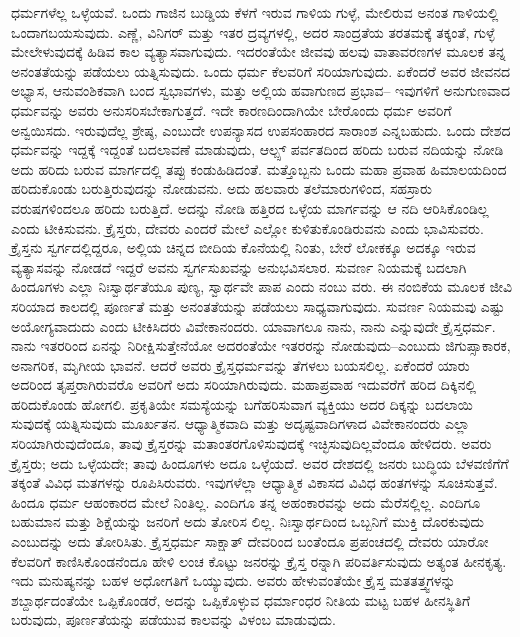 ಧರ್ಮಗಳೆಲ್ಲ ಒಳ್ಳೆಯವೆ. ಒಂದು ಗಾಜಿನ ಬುಡ್ಡಿಯ ಕೆಳಗೆ ಇರುವ ಗಾಳಿಯ ಗುಳ್ಳೆ, ಮೇಲಿರುವ ಅನಂತ ಗಾಳಿಯಲ್ಲಿ ಒಂದಾಗಬಯಸುವುದು. ಎಣ್ಣೆ, ವಿನಿಗರ್​ ಮತ್ತು ಇತರ ದ್ರವ್ಯಗಳಲ್ಲಿ, ಅದರ ಸಾಂದ್ರತೆಯ ತರತಮಕ್ಕೆ ತಕ್ಕಂತೆ, ಗುಳ್ಳೆ ಮೇಲೇಳುವುದಕ್ಕೆ ಹಿಡಿವ ಕಾಲ ವ್ಯತ್ಯಾಸವಾಗುವುದು. ಇದರಂತೆಯೇ ಜೀವವು ಹಲವು ವಾತಾವರಣಗಳ ಮೂಲಕ ತನ್ನ ಅನಂತತೆಯನ್ನು ಪಡೆಯಲು ಯತ್ನಿಸುವುದು. ಒಂದು ಧರ್ಮ ಕೆಲವರಿಗೆ ಸರಿಯಾಗುವುದು. ಏಕೆಂದರೆ ಅವರ ಜೀವನದ ಅಭ್ಯಾಸ, ಆನುವಂಶಿಕವಾಗಿ ಬಂದ ಸ್ವಭಾವಗಳು, ಮತ್ತು ಅಲ್ಲಿಯ ಹವಾಗುಣದ ಪ್ರಭಾವ– ಇವುಗಳಿಗೆ ಅನುಗುಣವಾದ ಧರ್ಮವನ್ನು ಅವರು ಅನುಸರಿಸಬೇಕಾಗುತ್ತದೆ. ಇದೇ ಕಾರಣದಿಂದಾಗಿಯೇ ಬೇರೊಂದು ಧರ್ಮ ಅವರಿಗೆ ಅನ್ವಯಿಸದು. ಇರುವುದೆಲ್ಲ ಶ್ರೇಷ್ಠ, ಎಂಬುದೇ ಉಪನ್ಯಾಸದ ಉಪಸಂಹಾರದ ಸಾರಾಂಶ ಎನ್ನಬಹುದು. ಒಂದು ದೇಶದ ಧರ್ಮವನ್ನು ಇದ್ದಕ್ಕೆ ಇದ್ದಂತೆ ಬದಲಾವಣೆ ಮಾಡುವುದು, ಆಲ್ಪ್ಸ್ ಪರ್ವತದಿಂದ ಹರಿದು ಬರುವ ನದಿಯನ್ನು ನೋಡಿ ಅದು ಹರಿದು ಬರುವ ಮಾರ್ಗದಲ್ಲಿ ತಪ್ಪು ಕಂಡುಹಿಡಿದಂತೆ. ಮತ್ತೊಬ್ಬನು ಒಂದು ಮಹಾ ಪ್ರವಾಹ ಹಿಮಾಲಯದಿಂದ ಹರಿದುಕೊಂಡು ಬರುತ್ತಿರುವುದನ್ನು ನೋಡುವನು. ಅದು ಹಲವಾರು ತಲೆಮಾರುಗಳಿಂದ, ಸಹಸ್ರಾರು ವರುಷಗಳಿಂದಲೂ ಹರಿದು ಬರುತ್ತಿದೆ. ಅದನ್ನು ನೋಡಿ ಹತ್ತಿರದ ಒಳ್ಳೆಯ ಮಾರ್ಗವನ್ನು ಆ ನದಿ ಆರಿಸಿಕೊಂಡಿಲ್ಲ ಎಂದು ಟೀಕಿಸುವನು. ಕ್ರೈಸ್ತರು, ದೇವರು ಎಂದರೆ ಮೇಲೆ ಎಲ್ಲೋ ಕುಳಿತುಕೊಂಡಿರುವನು ಎಂದು ಭಾವಿಸುವರು. ಕ್ರೈಸ್ತನು ಸ್ವರ್ಗದಲ್ಲಿದ್ದರೂ, ಅಲ್ಲಿಯ ಚಿನ್ನದ ಬೀದಿಯ ಕೊನೆಯಲ್ಲಿ ನಿಂತು, ಬೇರೆ ಲೋಕಕ್ಕೂ ಅದಕ್ಕೂ ಇರುವ ವ್ಯತ್ಯಾಸವನ್ನು ನೋಡದೆ ಇದ್ದರೆ ಅವನು ಸ್ವರ್ಗಸುಖವನ್ನು ಅನುಭವಿಸಲಾರ. ಸುವರ್ಣ ನಿಯಮಕ್ಕೆ ಬದಲಾಗಿ ಹಿಂದೂಗಳು ಎಲ್ಲಾ ನಿಃಸ್ವಾರ್ಥತೆಯೂ ಪುಣ್ಯ, ಸ್ವಾರ್ಥವೇ ಪಾಪ ಎಂದು ನಂಬು ವರು. ಈ ನಂಬಿಕೆಯ ಮೂಲಕ ಜೀವಿ ಸರಿಯಾದ ಕಾಲದಲ್ಲಿ ಪೂರ್ಣತೆ ಮತ್ತು ಅನಂತತೆಯನ್ನು ಪಡೆಯಲು ಸಾಧ್ಯವಾಗುವುದು. ಸುವರ್ಣ ನಿಯಮವು ಎಷ್ಟು ಅಯೋಗ್ಯವಾದುದು ಎಂದು ಟೀಕಿಸಿದರು ವಿವೇಕಾನಂದರು. ಯಾವಾಗಲೂ ನಾನು, ನಾನು ಎನ್ನುವುದೇ ಕ್ರೈಸ್ತಧರ್ಮ. ನಾನು ಇತರರಿಂದ ಏನನ್ನು ನಿರೀಕ್ಷಿಸುತ್ತೇನೆಯೋ ಅದರಂತೆಯೇ ಇತರರನ್ನು ನೋಡುವುದು–ಎಂಬುದು ಜಿಗುಪ್ಸಾಕಾರಕ, ಅನಾಗರಿಕ, ಮೃಗೀಯ ಭಾವನೆ. ಆದರೆ ಅವರು ಕ್ರೈಸ್ತಧರ್ಮವನ್ನು ತೆಗಳಲು ಬಯಸಲಿಲ್ಲ. ಏಕೆಂದರೆ ಯಾರು ಅದರಿಂದ ತೃಪ್ತರಾಗಿರುವರೊ ಅವರಿಗೆ ಅದು ಸರಿಯಾಗಿರುವುದು. ಮಹಾಪ್ರವಾಹ ಇದುವರೆಗೆ ಹರಿದ ದಿಕ್ಕಿನಲ್ಲಿ ಹರಿದುಕೊಂಡು ಹೋಗಲಿ. ಪ್ರಕೃತಿಯೇ ಸಮಸ್ಯೆಯನ್ನು ಬಗೆಹರಿಸುವಾಗ ವ್ಯಕ್ತಿಯು ಅದರ ದಿಕ್ಕನ್ನು ಬದಲಾಯಿ ಸುವುದಕ್ಕೆ ಯತ್ನಿಸುವುದು ಮೂರ್ಖತನ. ಆಧ್ಯಾತ್ಮಿಕವಾದಿ ಮತ್ತು ಅದೃಷ್ಟವಾದಿಗಳಾದ ವಿವೇಕಾನಂದರು ಎಲ್ಲಾ ಸರಿಯಾಗಿರುವುದೆಂದೂ, ತಾವು ಕ್ರೈಸ್ತರನ್ನು ಮತಾಂತರಗೊಳಿಸುವುದಕ್ಕೆ ಇಚ್ಛಿಸುವುದಿಲ್ಲವೆಂದೂ ಹೇಳಿದರು. ಅವರು ಕ್ರೈಸ್ತರು; ಅದು ಒಳ್ಳೆಯದೇ; ತಾವು ಹಿಂದೂಗಳು ಅದೂ ಒಳ್ಳೆಯದೆ. ಅವರ ದೇಶದಲ್ಲಿ ಜನರು ಬುದ್ಧಿಯ ಬೆಳವಣಿಗೆಗೆ ತಕ್ಕಂತೆ ವಿವಿಧ ಮತಗಳನ್ನು ರೂಪಿಸಿರುವರು. ಇವುಗಳೆಲ್ಲಾ ಆಧ್ಯಾತ್ಮಿಕ ವಿಕಾಸದ ವಿವಿಧ ಹಂತಗಳನ್ನು ಸೂಚಿಸುತ್ತವೆ. ಹಿಂದೂ ಧರ್ಮ ಆಹಂಕಾರದ ಮೇಲೆ ನಿಂತಿಲ್ಲ. ಎಂದಿಗೂ ತನ್ನ ಅಹಂಕಾರವನ್ನು ಅದು ಮೆರೆಸಲ್ಲಿಲ್ಲ. ಎಂದಿಗೂ ಬಹುಮಾನ ಮತ್ತು ಶಿಕ್ಷೆಯನ್ನು ಜನರಿಗೆ ಅದು ತೋರಿಸ ಲಿಲ್ಲ. ನಿಃಸ್ವಾರ್ಥದಿಂದ ಒಬ್ಬನಿಗೆ ಮುಕ್ತಿ ದೊರಕುವುದು ಎಂಬುದನ್ನು ಅದು ತೋರಿಸಿತು. ಕ್ರೈಸ್ತಧರ್ಮ ಸಾಕ್ಷಾತ್​ ದೇವರಿಂದ ಬಂತೆಂದೂ ಪ್ರಪಂಚದಲ್ಲಿ ದೇವರು ಯಾರೋ ಕೆಲವರಿಗೆ ಕಾಣಿಸಿಕೊಂಡನೆಂದೂ ಹೇಳಿ ಲಂಚ ಕೊಟ್ಟು ಜನರನ್ನು ಕ್ರೈಸ್ತ ರನ್ನಾಗಿ ಪರಿವರ್ತಿಸುವುದು ಅತ್ಯಂತ ಹೀನಕೃತ್ಯ. ಇದು ಮನುಷ್ಯನನ್ನು ಬಹಳ ಅಧೋಗತಿಗೆ ಒಯ್ಯುವುದು. ಅವರು ಹೇಳುವಂತೆಯೇ ಕ್ರೈಸ್ತ ಮತತತ್ತ್ವಗಳನ್ನು ಶಬ್ದಾರ್ಥದಂತೆಯೇ ಒಪ್ಪಿಕೊಂಡರೆ, ಅದನ್ನು ಒಪ್ಪಿಕೊಳ್ಳುವ ಧರ್ಮಾಂಧರ ನೀತಿಯ ಮಟ್ಟ ಬಹಳ ಹೀನಸ್ಥಿತಿಗೆ ಬರುವುದು, ಪೂರ್ಣತೆಯನ್ನು ಪಡೆಯುವ ಕಾಲವನ್ನು ವಿಳಂಬ ಮಾಡುವುದು.

